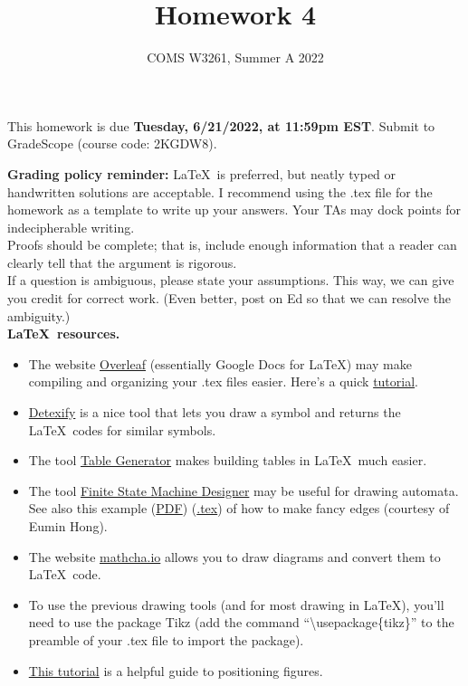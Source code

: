 \documentclass[letterpaper,11pt,twoside]{article}
\title{Homework 4}
\date{COMS W3261, Summer A 2022}
\theoremstyle{plain}
\theoremstyle{definition}
\theoremstyle{remark}
\theoremstyle{restate}
\begin{document}
\maketitle

This homework is due \textbf{Tuesday, 6/21/2022, at 11:59pm EST}. Submit to GradeScope (course code: 2KGDW8).

\textbf{Grading policy reminder:} \LaTeX~is preferred, but neatly typed or handwritten solutions are acceptable. I recommend using the .tex file for the homework as a template to write up your answers. Your TAs may dock points for indecipherable writing.\\

Proofs should be complete; that is, include enough information that a reader can clearly tell that the argument is rigorous. \\

If a question is ambiguous, please state your assumptions. This way, we can give you credit for correct work. (Even better, post on Ed so that we can resolve the ambiguity.) \\

\textbf{\LaTeX~resources.}
\begin{itemize}
    \item The website \href{https://www.overleaf.com/}{Overleaf} (essentially Google Docs for LaTeX) may make compiling and organizing your .tex files easier. Here's a quick \href{https://www.overleaf.com/learn/latex/Learn_LaTeX_in_30_minutes}{tutorial}.
    \item \href{https://detexify.kirelabs.org/classify.html}{Detexify} is a nice tool that lets you draw a symbol and returns the \LaTeX~codes for similar symbols. 
    \item The tool \href{https://www.tablesgenerator.com/}{Table Generator} makes building tables in \LaTeX~much easier.
    \item The tool \href{http://madebyevan.com/fsm/}{Finite State Machine Designer} may be useful for drawing automata. See also this example (\href{https://static.us.edusercontent.com/files/HZeTXimODzWeLvHIqsvjL2BG}{PDF}) (\href{https://static.us.edusercontent.com/files/RI3W8tQNvHMWFe9MkXV1KztA}{.tex}) of how to make fancy edges (courtesy of Eumin Hong).
    \item The website \href{https://www.mathcha.io/}{mathcha.io} allows you to draw diagrams and convert them to \LaTeX~code.
    \item To use the previous drawing tools (and for most drawing in \LaTeX), you'll need to use the package Tikz (add the command ``\textbackslash usepackage\{tikz\}'' to the preamble of your .tex file to import the package). 
    \item \href{https://www.overleaf.com/learn/latex/Positioning_of_Figures}{This tutorial} is a helpful guide to positioning figures.
\end{itemize}  
\end{document}
